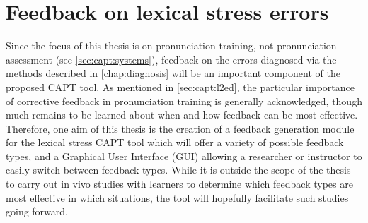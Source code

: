 %
%
\chapter{Feedback on lexical stress errors}
\label{chap:feedback}


Since the focus of this thesis is on pronunciation training, not pronunciation assessment (see \cref{sec:capt:systems}), feedback on the errors diagnosed via the methods described in \cref{chap:diagnosis} will be an important component of the proposed CAPT tool. As mentioned in \cref{sec:capt:l2ed}, the particular importance of corrective feedback in pronunciation training is generally acknowledged,
though much remains to be learned about when and how feedback can be most effective. Therefore, one aim of this thesis is the creation of a feedback generation module for the lexical stress CAPT tool which will offer a variety of possible feedback types, and a Graphical User Interface (GUI) allowing a researcher or instructor to easily switch between feedback types. While it is outside the scope of the thesis to carry out in vivo studies with learners to determine which feedback types are most effective in which situations, the tool will hopefully facilitate such studies going forward. 







